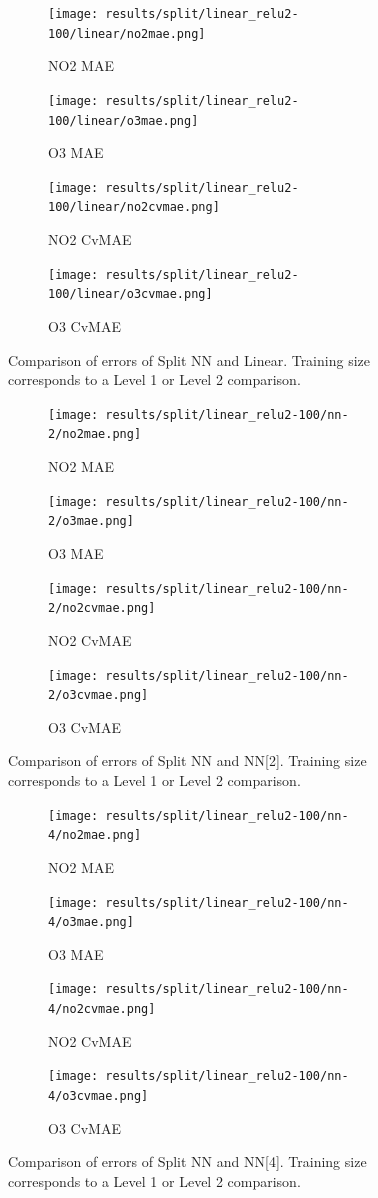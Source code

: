 \documentclass[journal abbreviation, manuscript]{copernicus}
\begin{document}
\begin{figure}[H]
\begin{subfigure}{0.49\textwidth}
\texttt{[image: results/split/linear\_relu2-100/linear/no2mae.png]}
\caption{NO2 MAE}
\end{subfigure}
\begin{subfigure}{0.49\textwidth}
\texttt{[image: results/split/linear\_relu2-100/linear/o3mae.png]}
\caption{O3 MAE}
\end{subfigure}
\begin{subfigure}{0.49\textwidth}
\texttt{[image: results/split/linear\_relu2-100/linear/no2cvmae.png]}
\caption{NO2 CvMAE}
\end{subfigure}
\begin{subfigure}{0.49\textwidth}
\texttt{[image: results/split/linear\_relu2-100/linear/o3cvmae.png]}
\caption{O3 CvMAE}
\end{subfigure}
\caption{Comparison of errors of Split NN and Linear. Training size corresponds to a Level 1 or Level 2 comparison.}
\end{figure}

\begin{figure}[H]
\begin{subfigure}{0.49\textwidth}
\texttt{[image: results/split/linear\_relu2-100/nn-2/no2mae.png]}
\caption{NO2 MAE}
\end{subfigure}
\begin{subfigure}{0.49\textwidth}
\texttt{[image: results/split/linear\_relu2-100/nn-2/o3mae.png]}
\caption{O3 MAE}
\end{subfigure}
\begin{subfigure}{0.49\textwidth}
\texttt{[image: results/split/linear\_relu2-100/nn-2/no2cvmae.png]}
\caption{NO2 CvMAE}
\end{subfigure}
\begin{subfigure}{0.49\textwidth}
\texttt{[image: results/split/linear\_relu2-100/nn-2/o3cvmae.png]}
\caption{O3 CvMAE}
\end{subfigure}
\caption{Comparison of errors of Split NN and NN[2]. Training size corresponds to a Level 1 or Level 2 comparison.}
\end{figure}

\begin{figure}[H]
\begin{subfigure}{0.49\textwidth}
\texttt{[image: results/split/linear\_relu2-100/nn-4/no2mae.png]}
\caption{NO2 MAE}
\end{subfigure}
\begin{subfigure}{0.49\textwidth}
\texttt{[image: results/split/linear\_relu2-100/nn-4/o3mae.png]}
\caption{O3 MAE}
\end{subfigure}
\begin{subfigure}{0.49\textwidth}
\texttt{[image: results/split/linear\_relu2-100/nn-4/no2cvmae.png]}
\caption{NO2 CvMAE}
\end{subfigure}
\begin{subfigure}{0.49\textwidth}
\texttt{[image: results/split/linear\_relu2-100/nn-4/o3cvmae.png]}
\caption{O3 CvMAE}
\end{subfigure}
\caption{Comparison of errors of Split NN and NN[4]. Training size corresponds to a Level 1 or Level 2 comparison.}
\end{figure}
\end{document}
